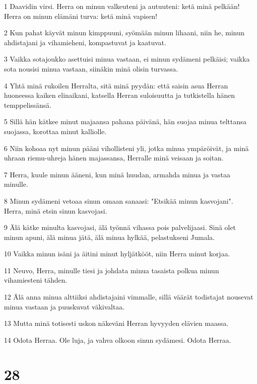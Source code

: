 \par 1 Daavidin virsi. Herra on minun valkeuteni ja autuuteni: ketä minä pelkään! Herra on minun elämäni turva: ketä minä vapisen!
\par 2 Kun pahat käyvät minun kimppuuni, syömään minun lihaani, niin he, minun ahdistajani ja vihamieheni, kompastuvat ja kaatuvat.
\par 3 Vaikka sotajoukko asettuisi minua vastaan, ei minun sydämeni pelkäisi; vaikka sota nousisi minua vastaan, siinäkin minä olisin turvassa.
\par 4 Yhtä minä rukoilen Herralta, sitä minä pyydän: että saisin asua Herran huoneessa kaiken elinaikani, katsella Herran suloisuutta ja tutkistella hänen temppelissänsä.
\par 5 Sillä hän kätkee minut majaansa pahana päivänä, hän suojaa minua telttansa suojassa, korottaa minut kalliolle.
\par 6 Niin kohoaa nyt minun pääni vihollisteni yli, jotka minua ympäröivät, ja minä uhraan riemu-uhreja hänen majassansa, Herralle minä veisaan ja soitan.
\par 7 Herra, kuule minun ääneni, kun minä huudan, armahda minua ja vastaa minulle.
\par 8 Minun sydämeni vetoaa sinun omaan sanaasi: "Etsikää minun kasvojani". Herra, minä etsin sinun kasvojasi.
\par 9 Älä kätke minulta kasvojasi, älä työnnä vihassa pois palvelijaasi. Sinä olet minun apuni, älä minua jätä, älä minua hylkää, pelastukseni Jumala.
\par 10 Vaikka minun isäni ja äitini minut hyljätkööt, niin Herra minut korjaa.
\par 11 Neuvo, Herra, minulle tiesi ja johdata minua tasaista polkua minun vihamiesteni tähden.
\par 12 Älä anna minua alttiiksi ahdistajaini vimmalle, sillä väärät todistajat nousevat minua vastaan ja puuskuvat väkivaltaa.
\par 13 Mutta minä totisesti uskon näkeväni Herran hyvyyden elävien maassa.
\par 14 Odota Herraa. Ole luja, ja vahva olkoon sinun sydämesi. Odota Herraa.

\chapter{28}

